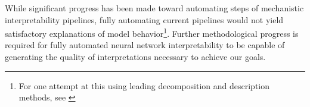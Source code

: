 While significant progress has been made toward automating steps of mechanistic interpretability pipelines, fully automating current pipelines would not yield satisfactory explanations of model behavior\footnote{For one attempt at this using leading decomposition and description methods, see \citet{marks2024sparsefeaturecircuitsdiscovering}}. Further methodological progress is required for fully automated neural network interpretability to be capable of generating the quality of interpretations necessary to achieve our goals.

